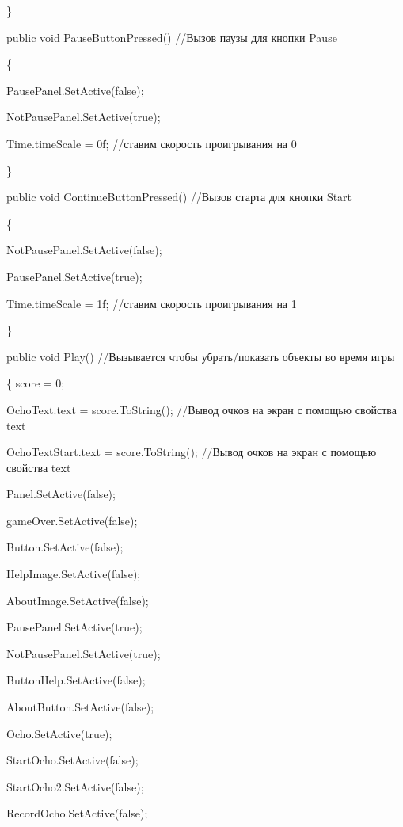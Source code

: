 \documentclass[14pt, oneside]{altsu-report}
\begin{document}
    \}

    
    public void PauseButtonPressed() //Вызов паузы для кнопки Pause
    
    \{
    
        PausePanel.SetActive(false); 
        
        NotPausePanel.SetActive(true);

        Time.timeScale = 0f; //ставим скорость проигрывания на 0
    
    \}

    public void ContinueButtonPressed() //Вызов старта для кнопки Start
    
    \{
    
        NotPausePanel.SetActive(false);
        
        PausePanel.SetActive(true);
        
        Time.timeScale = 1f; //ставим скорость проигрывания на 1 
        
    \}
    

    public void Play() //Вызывается чтобы убрать/показать объекты во время игры 
    
    \{
        score = 0;

        OchoText.text = score.ToString(); //Вывод очков на экран с помощью свойства text

        OchoTextStart.text = score.ToString(); //Вывод очков на экран с помощью свойства text

        Panel.SetActive(false);
        
        gameOver.SetActive(false);
        
        Button.SetActive(false);
        
        HelpImage.SetActive(false);
        
        AboutImage.SetActive(false);
        
        PausePanel.SetActive(true);
        
        NotPausePanel.SetActive(true);
        
        ButtonHelp.SetActive(false);
        
        AboutButton.SetActive(false);
        
        Ocho.SetActive(true);
        
        StartOcho.SetActive(false);
        
        StartOcho2.SetActive(false);
        
        RecordOcho.SetActive(false);
        
\end{document}
